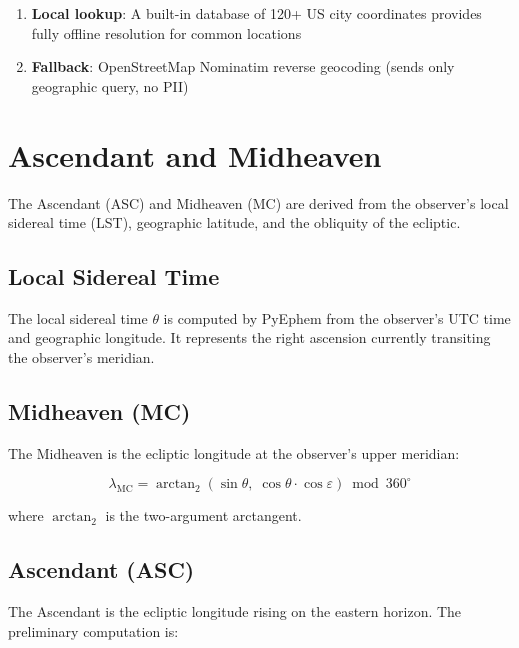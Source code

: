 \documentclass[11pt,letterpaper,twocolumn]{article}
\begin{document}
\begin{enumerate}[nosep]
    \item \textbf{Local lookup}: A built-in database of 120+ US city coordinates provides fully offline resolution for common locations
    \item \textbf{Fallback}: OpenStreetMap Nominatim reverse geocoding (sends only geographic query, no PII)
\end{enumerate}

\section{Ascendant and Midheaven}\label{sec:asc}

The Ascendant (ASC) and Midheaven (MC) are derived from the observer's local sidereal time (LST), geographic latitude, and the obliquity of the ecliptic.

\subsection{Local Sidereal Time}

The local sidereal time $\theta$ is computed by PyEphem from the observer's UTC time and geographic longitude. It represents the right ascension currently transiting the observer's meridian.

\subsection{Midheaven (MC)}

The Midheaven is the ecliptic longitude at the observer's upper meridian:

\begin{equation}\label{eq:mc}
\lambda_{\text{MC}} = \arctan_2(\sin\theta,\; \cos\theta \cdot \cos\varepsilon) \bmod 360^\circ
\end{equation}

where $\arctan_2$ is the two-argument arctangent.

\subsection{Ascendant (ASC)}

The Ascendant is the ecliptic longitude rising on the eastern horizon. The preliminary computation is:
\end{document}
